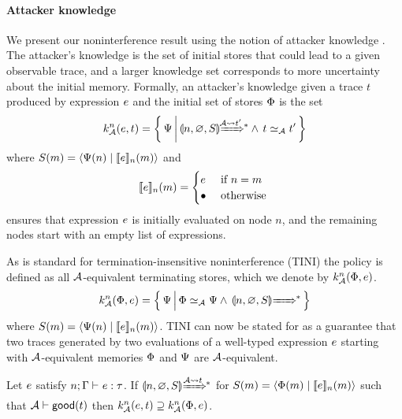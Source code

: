 \paragraph{Attacker knowledge}
We present our noninterference result using the notion of attacker knowledge \cite{Askarov:2008:TNL:1462455.1462485, 4223226}. The attacker's knowledge is the set of initial stores that could lead to a given observable trace, and a larger knowledge set corresponds to more uncertainty about the initial memory. Formally, an attacker's knowledge given a trace $t$ produced by expression $e$ and the initial set of stores $\Phi$ is the set
\begin{equation*}
k^n_{\Attacker}(\expr, t) = \left\{ \, \altglobalstore \, \middle\vert \, \gconfig{n}{\emptyenv}{S} \gstepstos[][\Attacker \filtertrace t'] \wedge \, t \simeq_{\Attacker} t' \, \right\}
\end{equation*}
where $S(m) = \langle \Psi(n) \mid \llbracket e \rrbracket_n(m) \rangle$ and
\begin{equation*}
\llbracket e \rrbracket_n(m) =
\begin{cases}
e & \text{ if } n = m\\
\bullet & \text{ otherwise }
\end{cases}
\end{equation*}
ensures that expression $e$ is initially evaluated on node $n$, and the remaining nodes start with an empty list of expressions.

As is standard for termination-insensitive noninterference (TINI) the policy \cite{6234468} is defined as all $\mathcal{A}$-equivalent terminating stores, which we denote by $k^n_{\mathcal{A}}(\Phi, e)$.
\begin{equation*}
k^n_{\Attacker}(\globalstore, \expr) = \left\{ \,\altglobalstore \, \middle\vert \, \globalstore \simeq_{\Attacker} \altglobalstore \wedge \, \gconfig{n}{\emptyenv}{S} \gstepstos \, \right\}
\end{equation*}
where $S(m) = \langle \Psi(n) \mid \llbracket e \rrbracket_n(m) \rangle$. TINI can now be stated for \lang{} as a guarantee that two traces generated by two evaluations of a well-typed expression $e$ starting with $\mathcal{A}$-equivalent memories $\Phi$ and $\Psi$ are $\mathcal{A}$-equivalent.

\begin{theorem}[Noninterference]\label{thm:ni}
Let $e$ satisfy $\hastype{n; \tenv}{\expr}{\type}$.
If $\gconfig{n}{\varnothing}{S} \gstepstos[][\Attacker \filtertrace t]$ for $S(m) = \langle \Phi(m) \mid \llbracket e \rrbracket_n(m) \rangle$ such that $\mathcal{A} \vdash \mathsf{good}(t)$ then $k^n_{\mathcal{A}}(e, t) \supseteq k^n_{\mathcal{A}}(\Phi, e)$.
\end{theorem}

